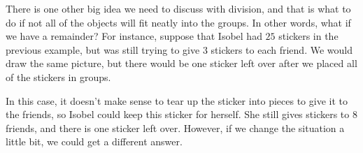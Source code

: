 \documentclass{ximera}
\begin{document}
There is one other big idea we need to discuss with division, and that is what to do if not all of the objects will fit neatly into the groups. In other words, what if we have a remainder? For instance, suppose that Isobel had $25$ stickers in the previous example, but was still trying to give $3$ stickers to each friend. We would draw the same picture, but there would be one sticker left over after we placed all of the stickers in groups. 

\begin{image}
\end{image}
In this case, it doesn't make sense to tear up the sticker into pieces to give it to the friends, so Isobel could keep this sticker for herself. She still gives stickers to $8$ friends, and there is one sticker left over. However, if we change the situation a little bit, we could get a different answer.
\end{document}
